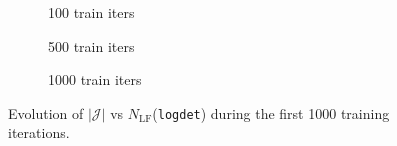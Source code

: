 \documentclass[a4paper,11pt]{article}
\begin{document}
%
\begin{figure}[htpb]
    \centering
    \begin{subfigure}{0.31\textwidth}
        
        \caption{\label{subfig:logdet1} 100 train iters}
    \end{subfigure}
    \hfill
    \begin{subfigure}{0.31\textwidth}
        
        \caption{\label{subfig:logdet2} 500 train iters}
    \end{subfigure}
    \hfill
    \begin{subfigure}{0.31\textwidth}
        
        \caption{\label{subfig:logdet3} 1000 train iters}
    \end{subfigure}
    \caption{\label{fig:logdet}Evolution of $\left|\mathcal{J}\right|$ vs $N_{\mathrm{LF}}$(\texttt{logdet}) during the first 1000 training iterations.}
\end{figure}


\end{document}
